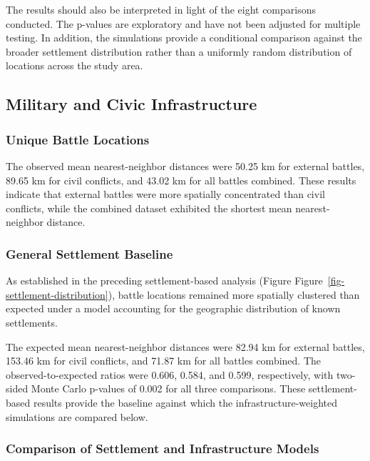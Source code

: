 \documentclass[
  letterpaper,
  DIV=11,
  numbers=noendperiod]{scrartcl}
\begin{document}
The results should also be interpreted in light of the eight comparisons
conducted. The p-values are exploratory and have not been adjusted for
multiple testing. In addition, the simulations provide a conditional
comparison against the broader settlement distribution rather than a
uniformly random distribution of locations across the study area.

\subsection{Military and Civic
Infrastructure}\label{military-and-civic-infrastructure-1}

\subsubsection{Unique Battle Locations}\label{unique-battle-locations}

The observed mean nearest-neighbor distances were 50.25 km for external
battles, 89.65 km for civil conflicts, and 43.02 km for all battles
combined. These results indicate that external battles were more
spatially concentrated than civil conflicts, while the combined dataset
exhibited the shortest mean nearest-neighbor distance.

\subsubsection{General Settlement
Baseline}\label{general-settlement-baseline}

As established in the preceding settlement-based analysis (Figure
Figure~\ref{fig-settlement-distribution}), battle locations remained
more spatially clustered than expected under a model accounting for the
geographic distribution of known settlements.

The expected mean nearest-neighbor distances were 82.94 km for external
battles, 153.46 km for civil conflicts, and 71.87 km for all battles
combined. The observed-to-expected ratios were 0.606, 0.584, and 0.599,
respectively, with two-sided Monte Carlo p-values of 0.002 for all three
comparisons. These settlement-based results provide the baseline against
which the infrastructure-weighted simulations are compared below.

\subsubsection{Comparison of Settlement and Infrastructure
Models}\label{comparison-of-settlement-and-infrastructure-models}
\end{document}
